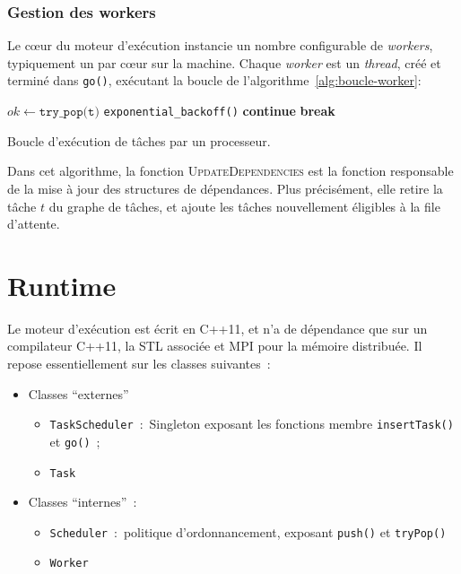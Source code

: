 \documentclass[11pt]{article}
\theoremstyle{plain} %
\theoremstyle{definition} %
\begin{document}
\subsubsection{Gestion des workers}
\label{sec:gestion-des-workers}
Le c\oe{}ur du moteur d'exécution instancie un nombre configurable de \emph{workers}, typiquement un par c\oe{}ur sur la machine.
Chaque \emph{worker} est un \emph{thread}, créé et terminé dans \texttt{go()}, exécutant la boucle de l'algorithme~\ref{alg:boucle-worker}:

\begin{algorithm}[!htpb]
    \begin{algorithmic}
    \State $ok \gets \texttt{try\_pop(t)}$
    \State \texttt{exponential\_backoff()}
    \State \textbf{continue}
    \EndIf
    \State \textbf{break}
    \EndIf
    \State {}
    \State {}
    \EndWhile
  \end{algorithmic}
  \caption{\label{alg:boucle-worker}Boucle d'exécution de tâches par un processeur.}
\end{algorithm}

Dans cet algorithme, la fonction \textsc{UpdateDependencies} est la fonction responsable de la mise à jour des structures de dépendances.
Plus précisément, elle retire la tâche $t$ du graphe de tâches, et ajoute les tâches nouvellement éligibles à la file d'attente.

\section{Runtime}
\label{sec:runtime}
Le moteur d'exécution est écrit en C++11, et n'a de dépendance que sur un compilateur C++11, la STL associée et MPI pour la mémoire distribuée.
Il repose essentiellement sur les classes suivantes~:~
\begin{itemize}
\item Classes ``externes''
  \begin{itemize}
  \item \texttt{TaskScheduler}~:~Singleton exposant les fonctions membre \texttt{insertTask()} et \texttt{go()}~;
  \item \texttt{Task}
  \end{itemize}
\item Classes ``internes''~:~
  \begin{itemize}
  \item \texttt{Scheduler}~:~politique d'ordonnancement, exposant \texttt{push()} et \texttt{tryPop()}
  \item \texttt{Worker}
  \end{itemize}
\end{itemize}
\end{document}
